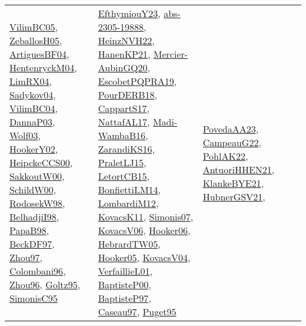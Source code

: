 {\begin{longtable}{llp{6cm}p{6cm}p{6cm}}
\href{articles/VilimBC05.pdf}{VilimBC05}\cite{VilimBC05}, \href{articles/ZeballosH05.pdf}{ZeballosH05}\cite{ZeballosH05}, \href{papers/ArtiguesBF04.pdf}{ArtiguesBF04}\cite{ArtiguesBF04}, \href{papers/HentenryckM04.pdf}{HentenryckM04}\cite{HentenryckM04}, \href{papers/LimRX04.pdf}{LimRX04}\cite{LimRX04}, \href{papers/Sadykov04.pdf}{Sadykov04}\cite{Sadykov04}, \href{papers/VilimBC04.pdf}{VilimBC04}\cite{VilimBC04}, \href{papers/DannaP03.pdf}{DannaP03}\cite{DannaP03}, \href{papers/Wolf03.pdf}{Wolf03}\cite{Wolf03}, \href{papers/HookerY02.pdf}{HookerY02}\cite{HookerY02}, \href{articles/HeipckeCCS00.pdf}{HeipckeCCS00}\cite{HeipckeCCS00}, \href{articles/SakkoutW00.pdf}{SakkoutW00}\cite{SakkoutW00}, \href{articles/SchildW00.pdf}{SchildW00}\cite{SchildW00}, \href{papers/RodosekW98.pdf}{RodosekW98}\cite{RodosekW98}, \href{articles/BelhadjiI98.pdf}{BelhadjiI98}\cite{BelhadjiI98}, \href{articles/PapaB98.pdf}{PapaB98}\cite{PapaB98}, \href{papers/BeckDF97.pdf}{BeckDF97}\cite{BeckDF97}, \href{articles/Zhou97.pdf}{Zhou97}\cite{Zhou97}, \href{papers/Colombani96.pdf}{Colombani96}\cite{Colombani96}, \href{papers/Zhou96.pdf}{Zhou96}\cite{Zhou96}, \href{papers/Goltz95.pdf}{Goltz95}\cite{Goltz95}, \href{papers/SimonisC95.pdf}{SimonisC95}\cite{SimonisC95} & \href{papers/EfthymiouY23.pdf}{EfthymiouY23}\cite{EfthymiouY23}, \href{articles/abs-2305-19888.pdf}{abs-2305-19888}\cite{abs-2305-19888}, \href{articles/HeinzNVH22.pdf}{HeinzNVH22}\cite{HeinzNVH22}, \href{papers/HanenKP21.pdf}{HanenKP21}\cite{HanenKP21}, \href{papers/Mercier-AubinGQ20.pdf}{Mercier-AubinGQ20}\cite{Mercier-AubinGQ20}, \href{articles/EscobetPQPRA19.pdf}{EscobetPQPRA19}\cite{EscobetPQPRA19}, \href{articles/PourDERB18.pdf}{PourDERB18}\cite{PourDERB18}, \href{papers/CappartS17.pdf}{CappartS17}\cite{CappartS17}, \href{articles/NattafAL17.pdf}{NattafAL17}\cite{NattafAL17}, \href{papers/Madi-WambaB16.pdf}{Madi-WambaB16}\cite{Madi-WambaB16}, \href{articles/ZarandiKS16.pdf}{ZarandiKS16}\cite{ZarandiKS16}, \href{papers/PraletLJ15.pdf}{PraletLJ15}\cite{PraletLJ15}, \href{articles/LetortCB15.pdf}{LetortCB15}\cite{LetortCB15}, \href{papers/BonfiettiLM14.pdf}{BonfiettiLM14}\cite{BonfiettiLM14}, \href{articles/LombardiM12.pdf}{LombardiM12}\cite{LombardiM12}, \href{articles/KovacsK11.pdf}{KovacsK11}\cite{KovacsK11}, \href{articles/Simonis07.pdf}{Simonis07}\cite{Simonis07}, \href{papers/KovacsV06.pdf}{KovacsV06}\cite{KovacsV06}, \href{articles/Hooker06.pdf}{Hooker06}\cite{Hooker06}, \href{papers/HebrardTW05.pdf}{HebrardTW05}\cite{HebrardTW05}, \href{articles/Hooker05.pdf}{Hooker05}\cite{Hooker05}, \href{papers/KovacsV04.pdf}{KovacsV04}\cite{KovacsV04}, \href{papers/VerfaillieL01.pdf}{VerfaillieL01}\cite{VerfaillieL01}, \href{articles/BaptisteP00.pdf}{BaptisteP00}\cite{BaptisteP00}, \href{papers/BaptisteP97.pdf}{BaptisteP97}\cite{BaptisteP97}, \href{papers/Caseau97.pdf}{Caseau97}\cite{Caseau97}, \href{papers/Puget95.pdf}{Puget95}\cite{Puget95} & \href{papers/PovedaAA23.pdf}{PovedaAA23}\cite{PovedaAA23}, \href{articles/CampeauG22.pdf}{CampeauG22}\cite{CampeauG22}, \href{articles/PohlAK22.pdf}{PohlAK22}\cite{PohlAK22}, \href{papers/AntuoriHHEN21.pdf}{AntuoriHHEN21}\cite{AntuoriHHEN21}, \href{papers/KlankeBYE21.pdf}{KlankeBYE21}\cite{KlankeBYE21}, \href{articles/HubnerGSV21.pdf}{HubnerGSV21}\cite{HubnerGSV21}, 
\end{longtable}}
